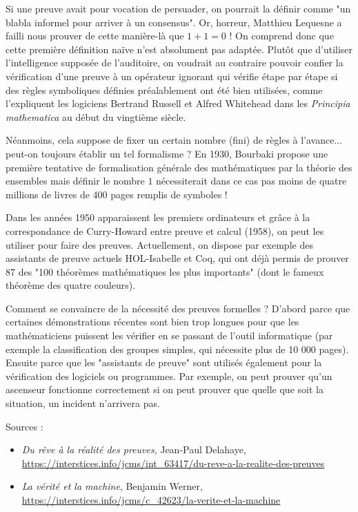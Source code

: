 Si une preuve avait pour vocation de persuader, on pourrait la définir comme "un blabla informel pour arriver à un consensus". Or, horreur, Matthieu Lequesne a failli nous prouver de cette manière-là que $1+1=0$ ! On comprend donc que cette première définition naïve n'est absolument pas adaptée. Plutôt que d'utiliser l'intelligence supposée de l'auditoire, on voudrait au contraire pouvoir confier la vérification d'une preuve à un opérateur ignorant qui vérifie étape par étape si des règles symboliques définies préalablement ont été bien utilisées, comme l'expliquent les logiciens Bertrand Russell et Alfred Whitehead dans les \emph{Principia mathematica} au début du vingtième siècle.


Néanmoins, cela suppose de fixer un certain nombre (fini) de règles à l'avance... peut-on toujours établir un tel formalisme ? En 1930, Bourbaki propose une première tentative de formalisation générale des mathématiques par la théorie des ensembles mais définir le nombre $1$ nécessiterait dans ce cas pas moins de quatre millions de livres de 400 pages remplis de symboles !

Dans les années 1950 apparaissent les premiers ordinateurs et grâce à la correspondance de Curry-Howard entre preuve et calcul (1958), on peut les utiliser pour faire des preuves. Actuellement, on dispose par exemple des assistants de preuve actuels HOL-Isabelle et Coq, qui ont déjà permis de prouver 87 des "100 théorèmes mathématiques les plus importants" (dont le fameux théorème des quatre couleurs).


Comment se convaincre de la nécessité des preuves formelles ? D'abord parce que certaines démonstrations récentes sont bien trop longues pour que les mathématiciens puissent les vérifier en se passant de l'outil informatique (par exemple la classification des groupes simples, qui nécessite plus de 10 000 pages). Ensuite parce que les "assistants de preuve" sont utilisés également pour la vérification des logiciels ou programmes. Par exemple, on peut prouver qu'un ascenseur fonctionne correctement si on peut prouver que quelle que soit la situation, un incident n'arrivera pas.

Sources :
\begin{itemize}
\item \emph{Du rêve à la réalité des preuves}, Jean-Paul Delahaye, \url{https://interstices.info/jcms/int\_63417/du-reve-a-la-realite-des-preuves}
\item \emph{La vérité et la machine}, Benjamin Werner,  \url{https://interstices.info/jcms/c\_42623/la-verite-et-la-machine}
\end{itemize}

